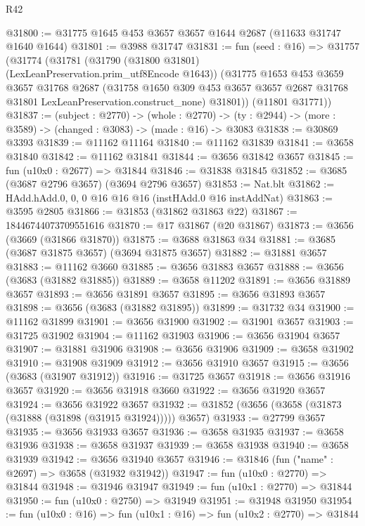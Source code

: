 \begin{lexlean}{R42}
\begin{coremodule}
@31800 := @31775 @1645 @453 @3657 @3657 @1644 @2687 (@11633 @31747 @1640 @1644)
@31801 := @3988 @31747
@31831 := fun (seed : @16) =>
  @31757
    (@31774
      (@31781
        (@31790 (@31800 @31801) (LexLeanPreservation.prim_utf8Encode @1643))
        (@31775
          @1653
          @453
          @3659
          @3657
          @31768
          @2687
          (@31758
            @1650
            @309
            @453
            @3657
            @3657
            @2687
            @31768
            @31801
            LexLeanPreservation.construct_none)
          @31801))
      (@11801 @31771))
@31837 := (subject : @2770) ->
  (whole : @2770) -> (ty : @2944) -> (more : @3589) -> (changed : @3083) -> (made : @16) -> @3083
@31838 := @30869 @3393
@31839 := @11162 @11164
@31840 := @11162 @31839
@31841 := @3658 @31840
@31842 := @11162 @31841
@31844 := @3656 @31842 @3657
@31845 := fun (u10x0 : @2677) => @31844
@31846 := @31838 @31845
@31852 := @3685 (@3687 @2796 @3657) (@3694 @2796 @3657)
@31853 := Nat.blt
@31862 := HAdd.hAdd.{0, 0, 0} @16 @16 @16 (instHAdd.{0} @16 instAddNat)
@31863 := @3595 @2805
@31866 := @31853 (@31862 @31863 @22)
@31867 := 18446744073709551616
@31870 := @17 @31867 (@20 @31867)
@31873 := @3656 (@3669 (@31866 @31870))
@31875 := @3688 @31863 @34
@31881 := @3685 (@3687 @31875 @3657) (@3694 @31875 @3657)
@31882 := @31881 @3657
@31883 := @11162 @3660
@31885 := @3656 @31883 @3657
@31888 := @3656 (@3683 (@31882 @31885))
@31889 := @3658 @11202
@31891 := @3656 @31889 @3657
@31893 := @3656 @31891 @3657
@31895 := @3656 @31893 @3657
@31898 := @3656 (@3683 (@31882 @31895))
@31899 := @31732 @34
@31900 := @11162 @31899
@31901 := @3656 @31900
@31902 := @31901 @3657
@31903 := @31725 @31902
@31904 := @11162 @31903
@31906 := @3656 @31904 @3657
@31907 := @31881 @31906
@31908 := @3656 @31906
@31909 := @3658 @31902
@31910 := @31908 @31909
@31912 := @3656 @31910 @3657
@31915 := @3656 (@3683 (@31907 @31912))
@31916 := @31725 @3657
@31918 := @3656 @31916 @3657
@31920 := @3656 @31918 @3660
@31922 := @3656 @31920 @3657
@31924 := @3656 @31922 @3657
@31932 := @31852 (@3656 (@3658 (@31873 (@31888 (@31898 (@31915 @31924))))) @3657)
@31933 := @27799 @3657
@31935 := @3656 @31933 @3657
@31936 := @3658 @31935
@31937 := @3658 @31936
@31938 := @3658 @31937
@31939 := @3658 @31938
@31940 := @3658 @31939
@31942 := @3656 @31940 @3657
@31946 := @31846 (fun ("name" : @2697) => @3658 (@31932 @31942))
@31947 := fun (u10x0 : @2770) => @31844
@31948 := @31946 @31947
@31949 := fun (u10x1 : @2770) => @31844
@31950 := fun (u10x0 : @2750) => @31949
@31951 := @31948 @31950
@31954 := fun (u10x0 : @16) => fun (u10x1 : @16) => fun (u10x2 : @2770) => @31844

\end{coremodule}
\end{lexlean}
